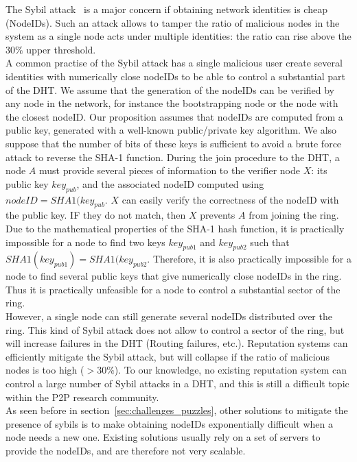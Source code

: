 The Sybil attack~\cite{the_sybil_attack} is a major concern if obtaining
network identities is cheap (NodeIDs). Such an attack allows to tamper the ratio of
malicious nodes in the system as a single node acts under multiple identities:
the ratio can rise above the $30\%$ upper threshold. \\

A common practise of the Sybil attack has a single malicious user create
several identities with numerically close nodeIDs to be able to control a
substantial part of the DHT. We assume that the generation of the nodeIDs can
be verified by any node in the network, for instance the bootstrapping node or
the node with the closest nodeID. Our proposition assumes that nodeIDs are
computed from a public key, generated with a well-known public/private key
algorithm. We also suppose that the number of bits of these keys is sufficient
to avoid a brute force attack to reverse the SHA-1 function. During the join
procedure to the DHT, a node $A$ must provide several pieces of information to
the verifier node $X$: its public key $key_{pub}$, and the associated nodeID computed using
$nodeID = SHA1(key_{pub}$. $X$ can easily verify the correctness of the nodeID
with the public key. IF they do not match, then $X$ prevents $A$ from joining
the ring.\\

Due to the mathematical properties of the SHA-1 hash function, it is
practically impossible for a node to find two keys $key_{pub1}$ and
$key_{pub2}$ such that $SHA1(key_{pub1}) = SHA1(key_{pub2}$. Therefore, it is
also practically impossible for a node to find several public keys that give
numerically close nodeIDs in the ring. Thus it is practically unfeasible for a
node to control a substantial sector of the ring.\\

However, a single node can still generate several nodeIDs distributed over the
ring. This kind of Sybil attack does not allow to control a sector of the ring,
but will increase failures in the DHT (Routing failures, etc.).  Reputation
systems can efficiently mitigate the Sybil attack, but will collapse if the
ratio of malicious nodes is too high ($> 30\%$). To our knowledge, no existing reputation system can control a large
number of Sybil attacks in a DHT, and this is still a difficult topic within
the P2P research community.\\

As seen before in section~\ref{sec:challenges_puzzles}, other solutions to
mitigate the presence of sybils is to make obtaining nodeIDs
exponentially difficult when a node needs a new
one. Existing solutions usually
rely on a set of servers to provide the nodeIDs, and are therefore not very
scalable.\\

